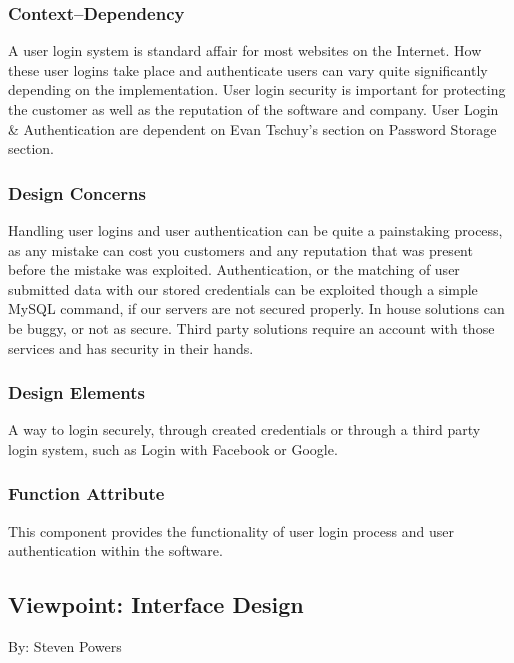 \documentclass[onecolumn, draftclsnofoot,10pt, compsoc]{IEEEtran}
\begin{document}
\subsubsection{Context--Dependency}
\noindent A user login system is standard affair for most websites on the 
Internet. How these user logins take place and authenticate users can vary 
quite significantly depending on the implementation. User login security is 
important for protecting the customer as well as the reputation of the 
software and company. User Login \& Authentication are dependent on Evan 
Tschuy's section on Password Storage section. \\

\subsubsection{Design Concerns}
\noindent Handling user logins and user authentication can be quite a painstaking process, as any mistake can cost you customers and any reputation that was present before the mistake was exploited. Authentication, or the matching of user submitted data with our stored credentials can be exploited though a simple MySQL command, if our servers are not secured properly. In house solutions can be buggy, or not as secure. Third party solutions require an account with those services and has security in their hands.

\subsubsection{Design Elements}
\noindent A way to login securely, through created credentials or through a
third party login system, such as Login with Facebook or Google. \\

\subsubsection{Function Attribute}
\noindent This component provides the functionality of user login process
and user authentication within the software. \\



\subsection{Viewpoint: Interface Design}
\noindent By: Steven Powers \\
\end{document}
